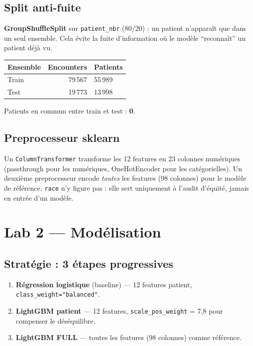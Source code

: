 \documentclass[11pt,a4paper]{article}
\begin{document}
\subsection{Split anti-fuite}

\textbf{GroupShuffleSplit} sur \texttt{patient\_nbr} (80/20) : un patient n'appara\^it que dans un seul ensemble. Cela \'evite la fuite d'information o\`u le mod\`ele ``reconna\^it'' un patient d\'ej\`a vu.

\begin{center}
\small
\begin{tabular}{@{}lrl@{}}
\toprule
\textbf{Ensemble} & \textbf{Encounters} & \textbf{Patients} \\
\midrule
Train & 79\,567 & 55\,989 \\
Test & 19\,773 & 13\,998 \\
\bottomrule
\end{tabular}
\end{center}

Patients en commun entre train et test : \textbf{0}.

\subsection{Preprocesseur sklearn}

Un \texttt{ColumnTransformer} transforme les 12 features en 23 colonnes num\'eriques (passthrough pour les num\'eriques, OneHotEncoder pour les cat\'egorielles). Un deuxi\`eme preprocesseur encode \emph{toutes} les features (98 colonnes) pour le mod\`ele de r\'ef\'erence. \texttt{race} n'y figure pas : elle sert uniquement \`a l'audit d'\'equit\'e, jamais en entr\'ee d'un mod\`ele.


\section{Lab 2 --- Mod\'elisation}

\subsection{Strat\'egie : 3 \'etapes progressives}

\begin{enumerate}
  \item \textbf{R\'egression logistique} (baseline) --- 12 features patient, \texttt{class\_weight="balanced"}.
  \item \textbf{LightGBM patient} --- 12 features, \texttt{scale\_pos\_weight} = 7{,}8 pour compenser le d\'es\'equilibre.
  \item \textbf{LightGBM FULL} --- toutes les features (98 colonnes) comme r\'ef\'erence.
\end{enumerate}
\end{document}
